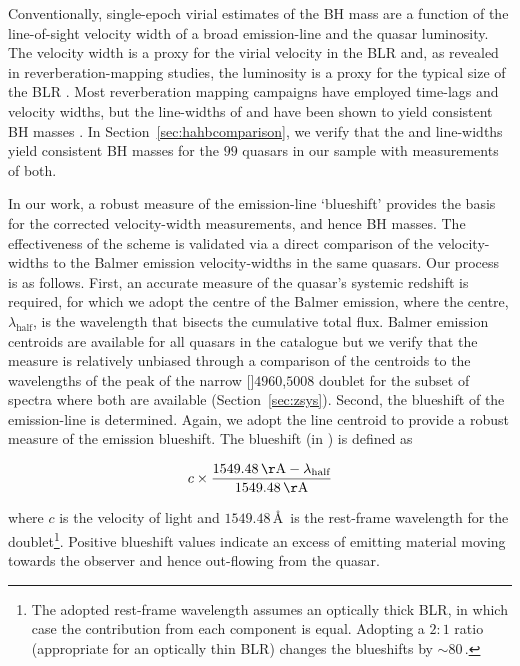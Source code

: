 Conventionally, single-epoch virial estimates of the BH mass are a function of the line-of-sight velocity width of a broad emission-line and the quasar luminosity. 
The velocity width is a proxy for the virial velocity in the BLR and, as revealed in reverberation-mapping studies, the luminosity is a proxy for the typical size of the BLR \citep[the $R_{\text{BLR}}-L$ relation; e.g.][]{kaspi00,kaspi07}. 
Most reverberation mapping campaigns have employed \hb time-lags and velocity widths, but the line-widths of \ha and  have been shown to yield consistent BH masses \citep[e.g.][]{mclure02,greene05b,onken08,shen08,wang09,rafiee11,mejia-restrepo16}. 
In Section~\ref{sec:hahbcomparison}, we verify that the \ha and \hb line-widths yield consistent BH masses for the $99$ quasars in our sample with measurements of both.     

In our work, a robust measure of the  emission-line `blueshift' provides the basis for the corrected  velocity-width measurements, and hence BH masses.
The effectiveness of the scheme is validated via a direct comparison of the  velocity-widths to the Balmer emission velocity-widths in the same quasars. 
Our process is as follows. 
First, an accurate measure of the quasar's systemic redshift is required, for which we adopt the centre of the Balmer emission, where the centre, $\lambda_{\text{half}}$, is the wavelength that bisects the cumulative total flux. 
Balmer emission centroids are available for all quasars in the catalogue but we verify that the measure is relatively unbiased through a comparison of the centroids to the wavelengths of the peak of the narrow []\ll$4960$,$5008$ doublet for the subset of spectra where both are available (Section~\ref{sec:zsys}). 
Second, the blueshift of the  emission-line is determined. 
Again, we adopt the line centroid to provide a robust measure of the  emission blueshift.
The blueshift (in \kms) is defined as

\begingroup\makeatletter{}\check@mathfonts
\begin{eqnarray}
\label{eq:civblueshift}
c \times \frac{1549.48\,{\mathrm \AA}-\lambda_{\text{half}}}{1549.48\,{\mathrm \AA}}
\end{eqnarray}
\endgroup

\noindent where $c$ is the velocity of light and $1549.48$\,\AA\, is the rest-frame wavelength for the  doublet\footnote{The adopted  rest-frame wavelength assumes an optically thick BLR, in which case the contribution from each component is equal. Adopting a $2:1$ ratio (appropriate for an optically thin BLR) changes the blueshifts by $\sim80$\,\kms.}. 
Positive blueshift values indicate an excess of emitting material moving towards the observer and hence out-flowing from the quasar. 

